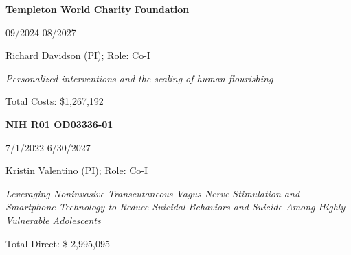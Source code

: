 \documentclass[letterpaper,10pt]{article}
\begin{document}
\begin{itemize}
	\begin{center}
		\noindent\parbox{0.7\textwidth}{\raggedright \textbf{Templeton World Charity Foundation}}\hfill%
		\parbox{0.2\textwidth}{\raggedright 09/2024-08/2027}
		\parbox{6.5in}{{Richard Davidson (PI)}; Role: Co-I }
		\parbox{6.5in}{\textit{Personalized interventions and the scaling of human flourishing}}
		\parbox{6.5in}{Total Costs: \$1,267,192}
	\end{center}


\begin{center}
	\noindent\parbox{0.7\textwidth}{\raggedright \textbf{NIH R01 OD03336-01}}\hfill%
	\parbox{0.2\textwidth}{\raggedright 7/1/2022-6/30/2027}
	\parbox{6.5in}{{Kristin Valentino (PI)}; Role: Co-I }
	\parbox{6.5in}{\textit{Leveraging Noninvasive Transcutaneous Vagus Nerve Stimulation and Smartphone Technology to Reduce Suicidal Behaviors and Suicide Among Highly Vulnerable Adolescents}}
	\parbox{6.5in}{Total Direct: \$ 2,995,095 }
\end{center}











\end{itemize}
\end{document}
